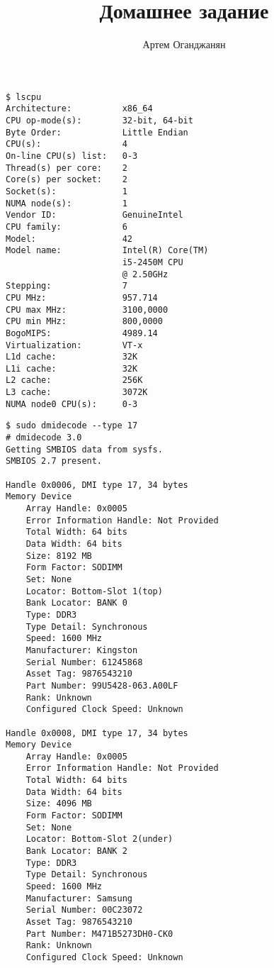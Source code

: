 \documentclass{article}
\title{Домашнее задание \textnumero 3}
\author{Артем Оганджанян}
\date{}
\begin{document}
\maketitle

\begin{multicols}{2}
\begin{verbatim}
$ lscpu                                                                        
Architecture:          x86_64
CPU op-mode(s):        32-bit, 64-bit
Byte Order:            Little Endian
CPU(s):                4
On-line CPU(s) list:   0-3
Thread(s) per core:    2
Core(s) per socket:    2
Socket(s):             1
NUMA node(s):          1
Vendor ID:             GenuineIntel
CPU family:            6
Model:                 42
Model name:            Intel(R) Core(TM)
                       i5-2450M CPU
                       @ 2.50GHz
Stepping:              7
CPU MHz:               957.714
CPU max MHz:           3100,0000
CPU min MHz:           800,0000
BogoMIPS:              4989.14
Virtualization:        VT-x
L1d cache:             32K
L1i cache:             32K
L2 cache:              256K
L3 cache:              3072K
NUMA node0 CPU(s):     0-3
\end{verbatim}
\vfill
\columnbreak
\begin{verbatim}
$ sudo dmidecode --type 17                                                                                                                    
# dmidecode 3.0
Getting SMBIOS data from sysfs.
SMBIOS 2.7 present.

Handle 0x0006, DMI type 17, 34 bytes
Memory Device
	Array Handle: 0x0005
	Error Information Handle: Not Provided
	Total Width: 64 bits
	Data Width: 64 bits
	Size: 8192 MB
	Form Factor: SODIMM
	Set: None
	Locator: Bottom-Slot 1(top)
	Bank Locator: BANK 0
	Type: DDR3
	Type Detail: Synchronous
	Speed: 1600 MHz
	Manufacturer: Kingston
	Serial Number: 61245868
	Asset Tag: 9876543210
	Part Number: 99U5428-063.A00LF 
	Rank: Unknown
	Configured Clock Speed: Unknown

Handle 0x0008, DMI type 17, 34 bytes
Memory Device
	Array Handle: 0x0005
	Error Information Handle: Not Provided
	Total Width: 64 bits
	Data Width: 64 bits
	Size: 4096 MB
	Form Factor: SODIMM
	Set: None
	Locator: Bottom-Slot 2(under)
	Bank Locator: BANK 2
	Type: DDR3
	Type Detail: Synchronous
	Speed: 1600 MHz
	Manufacturer: Samsung
	Serial Number: 00C23072
	Asset Tag: 9876543210
	Part Number: M471B5273DH0-CK0  
	Rank: Unknown
	Configured Clock Speed: Unknown
\end{verbatim}
\end{multicols}
\end{document}
